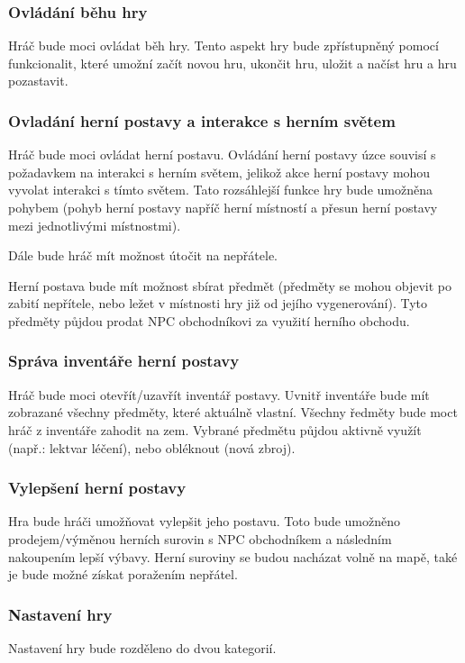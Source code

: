 \documentclass[12pt,a4paper]{article}
\begin{document}
\subsubsection{Ovládání běhu hry}
Hráč bude moci ovládat běh hry. Tento aspekt hry bude zpřístupněný pomocí
funkcionalit, které umožní začít novou hru, ukončit hru, uložit a načíst hru a
hru pozastavit.

\subsubsection{Ovladání herní postavy a interakce s herním světem}
Hráč bude moci ovládat herní postavu. Ovládání herní postavy úzce souvisí s
požadavkem na interakci s herním světem, jelikož akce herní postavy mohou vyvolat
interakci s tímto světem. Tato rozsáhlejší funkce hry bude umožněna pohybem
(pohyb herní postavy napříč herní místností a přesun herní postavy mezi
jednotlivými místnostmi).  

Dále bude hráč mít možnost útočit na nepřátele.  

Herní postava bude mít možnost sbírat předmět (předměty se mohou objevit po
zabití nepřítele, nebo ležet v místnosti hry již od jejího vygenerování). Tyto
předměty půjdou prodat NPC obchodníkovi za využití herního obchodu.

\subsubsection{Správa inventáře herní postavy}
Hráč bude moci otevřít/uzavřít inventář postavy. Uvnitř inventáře bude mít
zobrazané všechny předměty, které aktuálně vlastní. Všechny ředměty bude moct
hráč z inventáře zahodit na zem. Vybrané předmětu půjdou aktivně využít (např.:
lektvar léčení), nebo obléknout (nová zbroj).

\subsubsection{Vylepšení herní postavy}
Hra bude hráči umožňovat vylepšit jeho postavu. Toto bude umožněno
prodejem/výměnou herních surovin s NPC obchodníkem a následním nakoupením lepší
výbavy.  Herní suroviny se budou nacházat volně na mapě, také je bude možné
získat poražením nepřátel.

\subsubsection{Nastavení hry}
Nastavení hry bude rozděleno do dvou kategorií.
\end{document}
